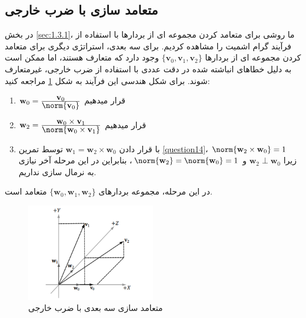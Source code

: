 \subsection{\textbf{متعامد سازی با ضرب خارجی}}
{
    \Large
    \begin{spacing}{1.5}
        در بخش \ref{sec:1.3.1}، ما روشی برای متعامد کردن مجموعه ای از بردارها با استفاده از فرآیند گرام اشمیت را مشاهده کردیم.
        برای سه بعدی، استراتژی دیگری برای متعامد کردن مجموعه ای از بردارها $\{\textbf{v}_{0},\textbf{v}_{1},\textbf{v}_{2}\}$ وجود دارد که متعارف هستند،
        اما ممکن است به دلیل خطاهای انباشته شده در دقت عددی با استفاده از ضرب خارجی، غیرمتعارف شوند.
        برای شکل هندسی این فرآیند به شکل \ref{fig:4.Session.1.1.15} مراجعه کنید:

        \begin{enumerate}[label=\textbf{\arabic*}.]
            \item {$\textbf{w}_{0}=\frac{\displaystyle\textbf{v}_{0}}{\displaystyle\norm{\textbf{v}_{0}}}$ قرار میدهیم}
            \item {$\textbf{w}_{2}=\frac{\displaystyle\textbf{w}_{0}\times\textbf{v}_{1}}{\displaystyle\norm{\textbf{w}_{0}\times\textbf{v}_{1}}}$ قرار میدهیم}
            \item {با قرار دادن $\textbf{w}_{1}=\textbf{w}_{2}\times\textbf{w}_{0}$ توسط تمرین \ref{question14}، $\norm{\textbf{w}_{2}\times\textbf{w}_{0}}=1$ زیرا $\textbf{w}_{2}\perp\textbf{w}_{0}$ و $\norm{\textbf{w}_{2}}=\norm{\textbf{w}_{0}}=1$،
            بنابراین در این مرحله آخر نیازی به نرمال سازی نداریم.}
        \end{enumerate}

        در این مرحله، مجموعه بردارهای $\{\textbf{w}_{0},\textbf{w}_{1},\textbf{w}_{2}\}$ متعامد است.

        \begin{figure}[H]
            \centering
            \setlength{\belowcaptionskip}{-10pt}
            \includegraphics[width=0.5\textwidth]{Images/4/1/4.Session.1.1.15}
            \caption {متعامد سازی سه بعدی با ضرب خارجی}
            \label{fig:4.Session.1.1.15}
        \end{figure}


\end{spacing}}
